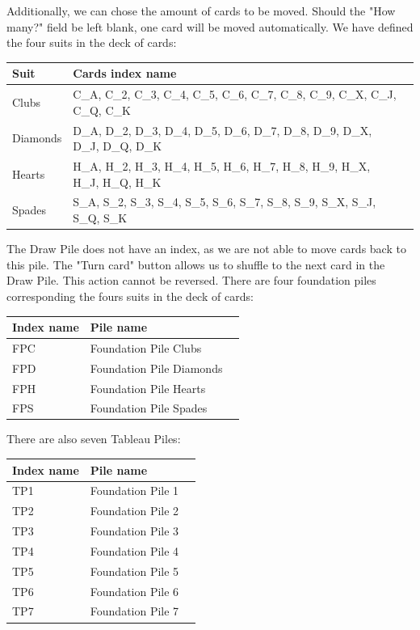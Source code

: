 \documentclass[runningheads,a4paper]{llncs}
\begin{document}
Additionally, we can chose the amount of cards to be moved. Should the "How many?" field be left blank, one card will be moved automatically.
We have defined the four suits in the deck of cards:
\begin{center}
	\begin{tabular}{ | l | l | l | }
		\hline
		Suit & Cards index name \\ \hline
		Clubs & C\_A, C\_2, C\_3, C\_4, C\_5, C\_6, C\_7, C\_8, C\_9, C\_X, C\_J, C\_Q, C\_K  \\ \hline
		Diamonds & D\_A, D\_2, D\_3, D\_4, D\_5, D\_6, D\_7, D\_8, D\_9, D\_X, D\_J, D\_Q, D\_K \\ \hline
		Hearts & H\_A, H\_2, H\_3, H\_4, H\_5, H\_6, H\_7, H\_8, H\_9, H\_X, H\_J, H\_Q, H\_K  \\ \hline
		Spades & S\_A,  S\_2, S\_3,  S\_4, S\_5,  S\_6, S\_7,  S\_8, S\_9,  S\_X, S\_J, S\_Q,  S\_K \\ \hline
	\end{tabular}
\end{center}
The Draw Pile does not have an index, as we are not able to move cards back to this pile. 
The "Turn card" button allows us to shuffle to the next card in the Draw Pile. This action cannot be reversed. 
There are four foundation piles corresponding the fours suits in the deck of cards:
\begin{center}
	\begin{tabular}{ | l | l | l | }
		\hline
		Index name & Pile name \\ \hline
		FPC & Foundation Pile Clubs  \\ \hline
		FPD & Foundation Pile Diamonds \\ \hline
		FPH & Foundation Pile Hearts  \\ \hline
		FPS & Foundation Pile Spades \\ \hline
	\end{tabular}
\end{center}

There are also seven Tableau Piles:
\begin{center}
	\begin{tabular}{ | l | l | l | }
		\hline
		Index name & Pile name \\ \hline
		TP1 & Foundation Pile 1  \\ \hline
		TP2 & Foundation Pile 2 \\ \hline
		TP3 & Foundation Pile 3  \\ \hline
		TP4 & Foundation Pile 4 \\ \hline
		TP5 & Foundation Pile 5  \\ \hline
		TP6 & Foundation Pile 6  \\ \hline
		TP7 & Foundation Pile 7  \\ \hline
	\end{tabular}
\end{center}
\end{document}
